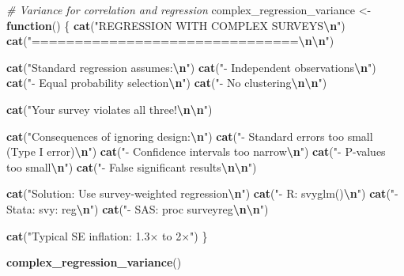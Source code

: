 \documentclass[
]{article}
\newenvironment{Shaded}{\begin{snugshade}}{\end{snugshade}}
\newcommand{\CommentTok}[1]{\textcolor[rgb]{0.56,0.35,0.01}{\textit{#1}}}
\newcommand{\ControlFlowTok}[1]{\textcolor[rgb]{0.13,0.29,0.53}{\textbf{#1}}}
\newcommand{\FunctionTok}[1]{\textcolor[rgb]{0.13,0.29,0.53}{\textbf{#1}}}
\newcommand{\NormalTok}[1]{#1}
\newcommand{\OtherTok}[1]{\textcolor[rgb]{0.56,0.35,0.01}{#1}}
\newcommand{\SpecialCharTok}[1]{\textcolor[rgb]{0.81,0.36,0.00}{\textbf{#1}}}
\newcommand{\StringTok}[1]{\textcolor[rgb]{0.31,0.60,0.02}{#1}}
\begin{document}
\begin{Shaded}
\begin{Highlighting}[]
\CommentTok{\# Variance for correlation and regression}
\NormalTok{complex\_regression\_variance }\OtherTok{\textless{}{-}} \ControlFlowTok{function}\NormalTok{() \{}
  \FunctionTok{cat}\NormalTok{(}\StringTok{"REGRESSION WITH COMPLEX SURVEYS}\SpecialCharTok{\textbackslash{}n}\StringTok{"}\NormalTok{)}
  \FunctionTok{cat}\NormalTok{(}\StringTok{"===============================}\SpecialCharTok{\textbackslash{}n\textbackslash{}n}\StringTok{"}\NormalTok{)}
  
  \FunctionTok{cat}\NormalTok{(}\StringTok{"Standard regression assumes:}\SpecialCharTok{\textbackslash{}n}\StringTok{"}\NormalTok{)}
  \FunctionTok{cat}\NormalTok{(}\StringTok{"{-} Independent observations}\SpecialCharTok{\textbackslash{}n}\StringTok{"}\NormalTok{)}
  \FunctionTok{cat}\NormalTok{(}\StringTok{"{-} Equal probability selection}\SpecialCharTok{\textbackslash{}n}\StringTok{"}\NormalTok{)}
  \FunctionTok{cat}\NormalTok{(}\StringTok{"{-} No clustering}\SpecialCharTok{\textbackslash{}n\textbackslash{}n}\StringTok{"}\NormalTok{)}
  
  \FunctionTok{cat}\NormalTok{(}\StringTok{"Your survey violates all three!}\SpecialCharTok{\textbackslash{}n\textbackslash{}n}\StringTok{"}\NormalTok{)}
  
  \FunctionTok{cat}\NormalTok{(}\StringTok{"Consequences of ignoring design:}\SpecialCharTok{\textbackslash{}n}\StringTok{"}\NormalTok{)}
  \FunctionTok{cat}\NormalTok{(}\StringTok{"{-} Standard errors too small (Type I error)}\SpecialCharTok{\textbackslash{}n}\StringTok{"}\NormalTok{)}
  \FunctionTok{cat}\NormalTok{(}\StringTok{"{-} Confidence intervals too narrow}\SpecialCharTok{\textbackslash{}n}\StringTok{"}\NormalTok{)}
  \FunctionTok{cat}\NormalTok{(}\StringTok{"{-} P{-}values too small}\SpecialCharTok{\textbackslash{}n}\StringTok{"}\NormalTok{)}
  \FunctionTok{cat}\NormalTok{(}\StringTok{"{-} False significant results}\SpecialCharTok{\textbackslash{}n\textbackslash{}n}\StringTok{"}\NormalTok{)}
  
  \FunctionTok{cat}\NormalTok{(}\StringTok{"Solution: Use survey{-}weighted regression}\SpecialCharTok{\textbackslash{}n}\StringTok{"}\NormalTok{)}
  \FunctionTok{cat}\NormalTok{(}\StringTok{"{-} R: svyglm()}\SpecialCharTok{\textbackslash{}n}\StringTok{"}\NormalTok{)}
  \FunctionTok{cat}\NormalTok{(}\StringTok{"{-} Stata: svy: reg}\SpecialCharTok{\textbackslash{}n}\StringTok{"}\NormalTok{)}
  \FunctionTok{cat}\NormalTok{(}\StringTok{"{-} SAS: proc surveyreg}\SpecialCharTok{\textbackslash{}n\textbackslash{}n}\StringTok{"}\NormalTok{)}
  
  \FunctionTok{cat}\NormalTok{(}\StringTok{"Typical SE inflation: 1.3× to 2×"}\NormalTok{)}
\NormalTok{\}}

\FunctionTok{complex\_regression\_variance}\NormalTok{()}
\end{Highlighting}
\end{Shaded}
\end{document}
